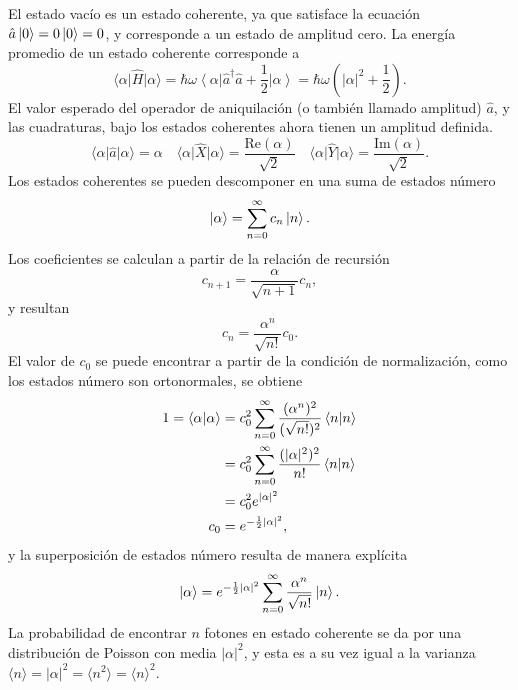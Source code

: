 El estado vacío es un estado coherente, ya que satisface la ecuación $\hat{a} \ket{0} = 0 \ket{0} = 0$, y corresponde a un estado de amplitud cero. La energía promedio de un estado coherente corresponde a
\begin{equation}
  \langle \alpha \vert \hat{H}\vert \alpha \rangle = \hbar\omega \left\langle \alpha \right\vert \hat{a}^{\dagger}\hat{a} + \frac{1}{2} \left\vert \alpha \right\rangle = \hbar\omega \left(|\alpha|^2 + \frac{1}{2} \right).
\end{equation}
El valor esperado del operador de aniquilación (o también llamado amplitud) $\hat{a}$, y las cuadraturas, bajo los estados coherentes ahora tienen un amplitud definida.
\begin{equation}
  \langle \alpha \vert \hat{a} \vert\alpha \rangle = \alpha \quad \langle \alpha \vert \hat{X} \vert \alpha \rangle = \frac{\mathrm{Re}(\alpha)}{\sqrt{2}} \quad \langle \alpha \vert \hat{Y} \vert \alpha\rangle = \frac{\mathrm{Im}(\alpha)}{\sqrt{2}}.
\end{equation}
Los estados coherentes se pueden descomponer en una suma de estados número
\begin{equation}
  \ket{\alpha} = \sum_{n=0}^{\infty} c_n \ket{n}.
\end{equation}
Los coeficientes se calculan a partir de la relación de recursión
\begin{equation}
  c_{n+1} = \frac{\alpha}{\sqrt{n+1}}c_n,
\end{equation}
y resultan
\begin{equation}
  c_n = \frac{\alpha^n }{\sqrt{n!}}c_0.
\end{equation}
El valor de $c_0$ se puede encontrar a partir de la condición de normalización, como los estados número son ortonormales, se obtiene
\begin{align}
  1 = \braket{\alpha}{\alpha} & = c_0^2 \sum_{n=0}^{\infty} \frac{(\alpha^n)^2}{(\sqrt{n!})^2}\braket{n}{n} \\ &= c_0^2  \sum_{n=0}^{\infty} \frac{(|\alpha|^2)^2}{n!}\braket{n}{n}\\ &= c_0^2 e^{|\alpha|^2} \\
  c_0                         & = e^{-\frac{1}{2}|\alpha|^2},
\end{align}
y la superposición de estados número resulta de manera explícita
\begin{equation}
  \ket{\alpha} = e^{-\frac{1}{2}|\alpha|^2} \sum_{n=0}^{\infty} \frac{\alpha^n}{\sqrt{n!}}\ket{n}.
\end{equation}
La probabilidad de encontrar $n$ fotones en estado coherente se da por una distribución de Poisson con media $|\alpha|^2$, y esta es a su vez igual a la varianza $\langle n \rangle = |\alpha|^2 = \langle n^2 \rangle = \langle n \rangle^2$.
